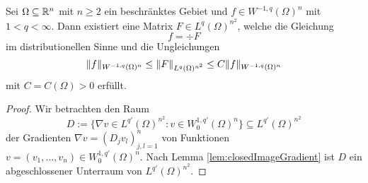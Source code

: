 \begin{lem}
  \label{lem:divRepresentation}
  Sei $\Omega \subseteq \mathbb{R}^n$ mit $n \geq 2$ ein beschränktes Gebiet und $f \in W^{-1,q}(\Omega)^n$ mit $1 < q < \infty$.
  Dann existiert eine Matrix $F \in L^q(\Omega)^{n^2}$, welche die Gleichung
  $$ f = \div F $$
  im distributionellen Sinne und die Ungleichungen
  $$
  \lVert  f  \rVert_{W^{-1,q}(\Omega)^n} 
  \leq \lVert  F  \rVert_{L^q(\Omega)^{n^2}} 
  \leq C \lVert  f  \rVert_{W^{-1,q}(\Omega)^n}
  $$
  mit $C = C(\Omega) > 0$ erfüllt.
\end{lem}

\begin{proof}
  Wir betrachten den Raum
  $$
  D := \{\nabla v \in L^{q'}(\Omega)^{n^2} \colon v \in W_0^{1,q'}(\Omega)^n\} \subseteq L^{q'}(\Omega)^{n^2}
  $$
  der Gradienten $\nabla v = (D_j v_l)_{j,l=1}^n$ von Funktionen $v = (v_1,\dots,v_n) \in W_0^{1,q'}(\Omega)^n$.
  Nach Lemma \ref{lem:closedImageGradient} ist $D$ ein abgeschlossener Unterraum von $L^{q'}(\Omega)^{n^2}$.


\end{proof}
